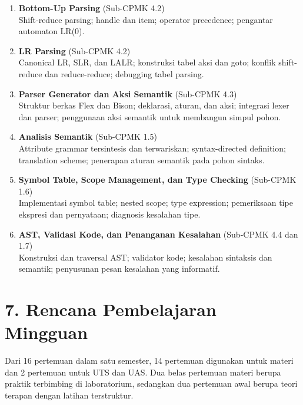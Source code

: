 \documentclass[12pt,a4paper]{article}
\begin{document}
\begin{enumerate}[leftmargin=*]
  \item \textbf{Bottom-Up Parsing} (Sub-CPMK 4.2)\\
  Shift-reduce parsing; handle dan item; operator precedence; pengantar automaton LR(0).

  \item \textbf{LR Parsing} (Sub-CPMK 4.2)\\
  Canonical LR, SLR, dan LALR; konstruksi tabel aksi dan goto; konflik shift-reduce dan reduce-reduce; debugging tabel parsing.

  \item \textbf{Parser Generator dan Aksi Semantik} (Sub-CPMK 4.3)\\
  Struktur berkas Flex dan Bison; deklarasi, aturan, dan aksi; integrasi lexer dan parser; penggunaan aksi semantik untuk membangun simpul pohon.

  \item \textbf{Analisis Semantik} (Sub-CPMK 1.5)\\
  Attribute grammar tersintesis dan terwariskan; syntax-directed definition; translation scheme; penerapan aturan semantik pada pohon sintaks.

  \item \textbf{Symbol Table, Scope Management, dan Type Checking} (Sub-CPMK 1.6)\\
  Implementasi symbol table; nested scope; type expression; pemeriksaan tipe ekspresi dan pernyataan; diagnosis kesalahan tipe.

  \item \textbf{AST, Validasi Kode, dan Penanganan Kesalahan} (Sub-CPMK 4.4 dan 1.7)\\
  Konstruksi dan traversal AST; validator kode; kesalahan sintaksis dan semantik; penyusunan pesan kesalahan yang informatif.
\end{enumerate}

\vspace{0.5cm}

\section*{7. Rencana Pembelajaran Mingguan}

Dari 16 pertemuan dalam satu semester, 14 pertemuan digunakan untuk materi dan 2 pertemuan untuk UTS dan UAS. Dua belas pertemuan materi berupa praktik terbimbing di laboratorium, sedangkan dua pertemuan awal berupa teori terapan dengan latihan terstruktur.
\end{document}

